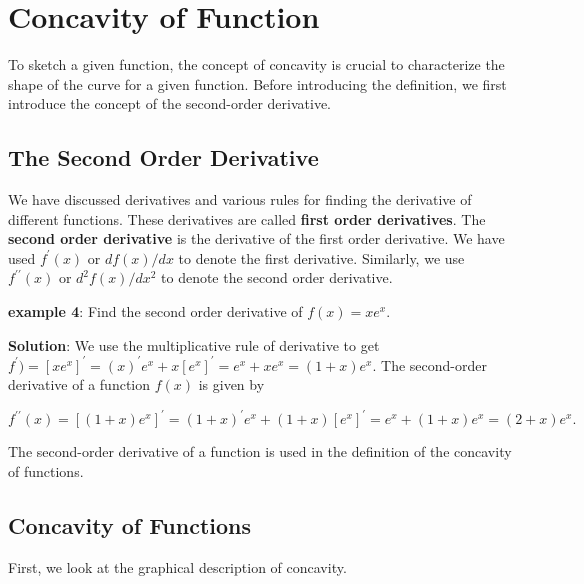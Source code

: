 \documentclass[
]{book}
\begin{document}
\hfill\break

\hypertarget{concavity-of-function}{%
\section{Concavity of Function}\label{concavity-of-function}}

To sketch a given function, the concept of concavity is crucial to characterize the shape of the curve for a given function. Before introducing the definition, we first introduce the concept of the second-order derivative.

\hfill\break

\hypertarget{the-second-order-derivative}{%
\subsection{The Second Order Derivative}\label{the-second-order-derivative}}

We have discussed derivatives and various rules for finding the derivative of different functions. These derivatives are called \textbf{first order derivatives}. The \textbf{second order derivative} is the derivative of the first order derivative. We have used \(f^\prime(x)\) or \(df(x)/dx\) to denote the first derivative. Similarly, we use \(f^{\prime\prime}(x)\) or \(d^2f(x)/dx^2\) to denote the second order derivative.

\textbf{example 4}: Find the second order derivative of \(f(x) = xe^x\).

\textbf{Solution}: We use the multiplicative rule of derivative to get \(f^\prime) = [xe^x]^\prime = (x)^\prime e^x + x [e^x]^\prime = e^x + xe^x = (1+x)e^x\). The second-order derivative of a function \(f(x)\) is given by

\[
f^{\prime\prime}(x) = [(1+x)e^x]^\prime = (1+x)^\prime e^x + (1+x)[e^x]^\prime =e^x + (1 + x) e^x  = (2 + x) e^x.
\]

The second-order derivative of a function is used in the definition of the concavity of functions.

\hfill\break

\hypertarget{concavity-of-functions}{%
\subsection{Concavity of Functions}\label{concavity-of-functions}}

First, we look at the graphical description of concavity.
\end{document}
